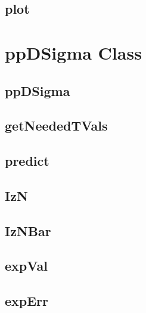 \documentclass{book}
\begin{document}
\section{plot}

\chapter{ppDSigma Class}

\section{ppDSigma}

\section{getNeededTVals}

\section{predict}

\section{IzN}

\section{IzNBar}

\section{expVal}

\section{expErr}

\end{document}
